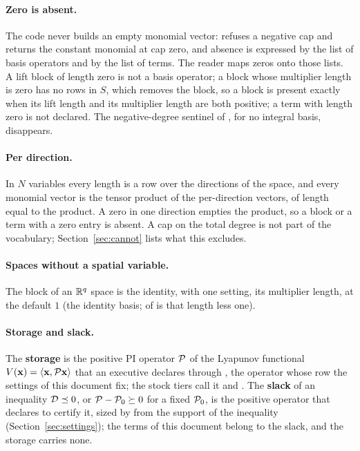 \paragraph{Zero is absent.} The code never builds an empty monomial vector:  refuses a negative cap and returns the constant monomial at cap zero, and absence is expressed by the  list of basis operators and by the list of terms. The reader maps zeros onto those lists. A lift block of length zero is not a basis operator; a block whose multiplier length is zero has no rows in $S$, which removes the block, so a block is present exactly when its lift length and its multiplier length are both positive; a term with length zero is not declared. The negative-degree sentinel of ,  for no integral basis, disappears.

\paragraph{Per direction.} In $N$ variables every length is a row over the directions of the space, and every monomial vector is the tensor product of the per-direction vectors, of length equal to the product. A zero in one direction empties the product, so a block or a term with a zero entry is absent. A cap on the total degree is not part of the vocabulary; Section~\ref{sec:cannot} lists what this excludes.

\paragraph{Spaces without a spatial variable.} The block of an $\mathbb{R}^q$ space is the identity, with one setting, its multiplier length, at the default $1$ (the identity basis;  of  is that length less one).

\paragraph{Storage and slack.} The \textbf{storage} is the positive PI operator $\mathcal{P}$ of the Lyapunov functional $V(\mathbf{x})=\left\langle \mathbf{x},\mathcal{P}\mathbf{x}\right\rangle$ that an executive declares through , the operator whose row the settings of this document fix; the stock tiers call it  and . The \textbf{slack} of an inequality $\mathcal{D}\preceq0$, or $\mathcal{P}-\mathcal{P}_0\succeq0$ for a fixed $\mathcal{P}_0$, is the positive operator that  declares to certify it, sized by  from the support of the inequality (Section~\ref{sec:settings}); the terms of this document belong to the slack, and the storage carries none.

